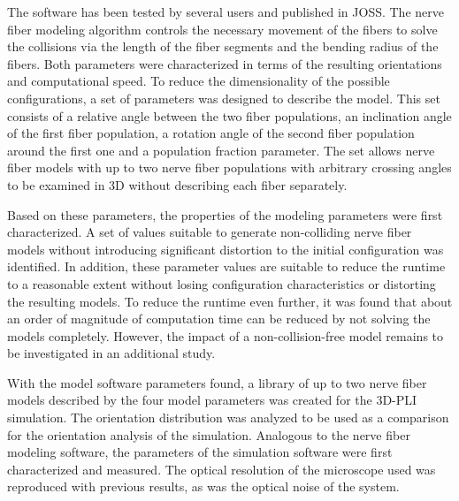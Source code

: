 The software has been tested by several users and published in \ac{JOSS}.
% 
% 
% 
% 
The nerve fiber modeling algorithm controls the necessary movement of the fibers to solve the collisions via the length of the fiber segments and the bending radius of the fibers.
Both parameters were characterized in terms of the resulting orientations and computational speed.
To reduce the dimensionality of the possible configurations, a set of parameters was designed to describe the model.
This set consists of a relative angle between the two fiber populations, an inclination angle of the first fiber population, a rotation angle of the second fiber population around the first one and a population fraction parameter.
The set allows nerve fiber models with up to two nerve fiber populations with arbitrary crossing angles to be examined in 3D without describing each fiber separately.
\par
% 
Based on these parameters, the properties of the modeling parameters were first characterized.
A set of values suitable to generate non-colliding nerve fiber models without introducing significant distortion to the initial configuration was identified.
In addition, these parameter values are suitable to reduce the runtime to a reasonable extent without losing configuration characteristics or distorting the resulting models.
To reduce the runtime even further, it was found that about an order of magnitude of computation time can be reduced by not solving the models completely.
However, the impact of a non-collision-free model remains to be investigated in an additional study.
\par
% 
With the model software parameters found, a library of up to two nerve fiber models described by the four model parameters was created for the \ac{3D-PLI} simulation.
The orientation distribution was analyzed to be used as a comparison for the orientation analysis of the simulation.
% 
% 
% 
% 
Analogous to the nerve fiber modeling software, the parameters of the simulation software were first characterized and measured.
The optical resolution of the microscope used was reproduced with previous results, as was the optical noise of the system.
